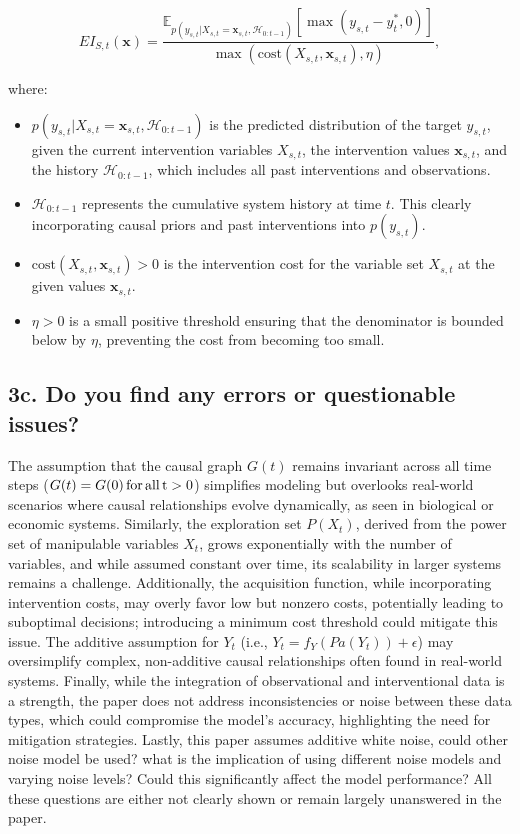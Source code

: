 \documentclass[a4paper,10pt]{article}
\begin{document}
\begin{equation}
EI_{S,t}(\mathbf{x}) = \frac{\mathbb{E}_{p(y_{s,t} | X_{s,t} = \mathbf{x}_{s,t}, \mathcal{H}_{0:t-1})}[\max(y_{s,t} - y^*_t, 0)]}{\max(\text{cost}(X_{s,t}, \mathbf{x}_{s,t}), \eta)},
\end{equation}

where:
\begin{itemize}
    \item \(p(y_{s,t} | X_{s,t} = \mathbf{x}_{s,t}, \mathcal{H}_{0:t-1})\) is the predicted distribution of the target \(y_{s,t}\), given the current intervention variables \(X_{s,t}\), the intervention values \(\mathbf{x}_{s,t}\), and the history \(\mathcal{H}_{0:t-1}\), which includes all past interventions and observations. 
    \item \(\mathcal{H}_{0:t-1}\) represents the cumulative system history at time \(t\). This clearly incorporating causal priors and past interventions into \(p(y_{s,t})\).
    \item \(\text{cost}(X_{s,t}, \mathbf{x}_{s,t}) > 0\) is the intervention cost for the variable set \(X_{s,t}\) at the given values \(\mathbf{x}_{s,t}\).
    \item \(\eta > 0\) is a small positive threshold ensuring that the denominator is bounded below by \(\eta\), preventing the cost from becoming too small.
\end{itemize}
   

\subsection*{3c. Do you find any errors or questionable issues? }

The assumption that the causal graph  $G(t)$ remains invariant across all time steps ($G(t) = G(0) \rm\, for \,all \,t>0$) simplifies modeling but overlooks real-world scenarios where causal relationships evolve dynamically, as seen in biological or economic systems. Similarly, the exploration set ${P(X_{t})}$, derived from the power set of manipulable variables ${X}_{t}$, grows exponentially with the number of variables, and while assumed constant over time, its scalability in larger systems remains a challenge. Additionally, the acquisition function, while incorporating intervention costs, may overly favor low but nonzero costs, potentially leading to suboptimal decisions; introducing a minimum cost threshold could mitigate this issue. The additive assumption for $Y_t$ (i.e., $Y_t = f_Y(Pa(Y_t)) + \epsilon$) may oversimplify complex, non-additive causal relationships often found in real-world systems. Finally, while the integration of observational and interventional data is a strength, the paper does not address inconsistencies or noise between these data types, which could compromise the model's accuracy, highlighting the need for mitigation strategies. Lastly, this paper assumes additive white noise, could other noise model be used? what is the implication of using different noise models and varying noise levels? Could this significantly affect the model performance? All these questions are either not clearly shown or remain largely unanswered in the paper. 
\end{document}
